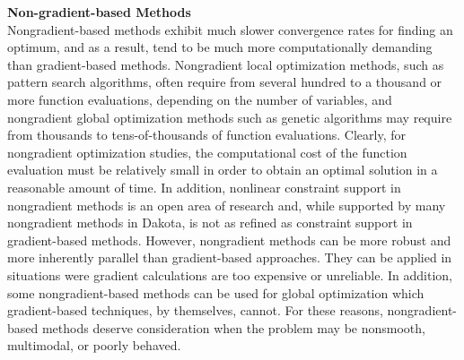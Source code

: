 {\bf Non-gradient-based Methods} \\
Nongradient-based methods exhibit much slower convergence rates for
finding an optimum, and as a result, tend to be much more
computationally demanding than gradient-based methods. Nongradient
local optimization methods, such as pattern search algorithms, often
require from several hundred to a thousand or more function
evaluations, depending on the number of variables, and nongradient
global optimization methods such as genetic algorithms may require
from thousands to tens-of-thousands of function evaluations. Clearly,
for nongradient optimization studies, the computational cost of the
function evaluation must be relatively small in order to obtain an
optimal solution in a reasonable amount of time. In addition,
nonlinear constraint support in nongradient methods is an open area of
research and, while supported by many nongradient methods in Dakota,
is not as refined as constraint support in gradient-based
methods. However, nongradient methods can be more robust and more
inherently parallel than gradient-based approaches. They can be
applied in situations were gradient calculations are too expensive or
unreliable. In addition, some nongradient-based methods can be used
for global optimization which gradient-based techniques, by
themselves, cannot. For these reasons, nongradient-based methods
deserve consideration when the problem may be nonsmooth, multimodal,
or poorly behaved.

